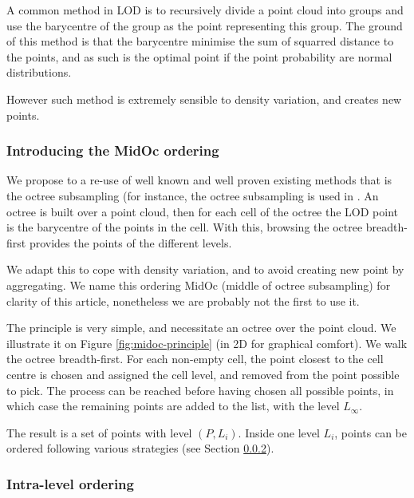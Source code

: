 		A common method in LOD is to recursively divide a point cloud into groups and use the barycentre of the group as the point representing this group. The ground of this method is that the barycentre minimise the sum of squarred distance to the points, and as such is the optimal point if the point probability are normal distributions.
		
		However such method is extremely sensible to density variation, and creates new points. 
		
		\subsubsection{Introducing the MidOc ordering}
		
		
		We propose to a re-use of well known and well proven existing methods that is the octree subsampling (for instance, the octree subsampling is used in \cite{Girardeau-Montaut2014}.
		An octree is built over a point cloud, then for each cell of the octree the LOD point is the barycentre of the points in the cell.  With this, browsing the octree breadth-first provides the points of the different levels.
		
		We adapt this to cope with density variation, and to avoid creating new point by aggregating.   
		We name this ordering MidOc (middle of octree subsampling) for clarity of this article, nonetheless we are probably not the first to use it.
		
		The principle is very simple, and necessitate an octree over the point cloud.
		We illustrate it on Figure \ref{fig:midoc-principle} (in 2D for graphical comfort).
		We walk the octree breadth-first.
		For each non-empty cell, the point closest to the cell centre is chosen and assigned the cell level,
		and removed from the point possible to pick.
		The process can be reached before having chosen all possible points,
		in which case the remaining points are added to the list, with the level $L_\infty$.
		
		The result is a set of points with level $(P,L_i)$.
		Inside one level $L_i$, points can be ordered following various strategies (see Section \ref{method.intralevel}). 
		  
		\subsubsection{Intra-level ordering}
		\label{method.intralevel}
		
